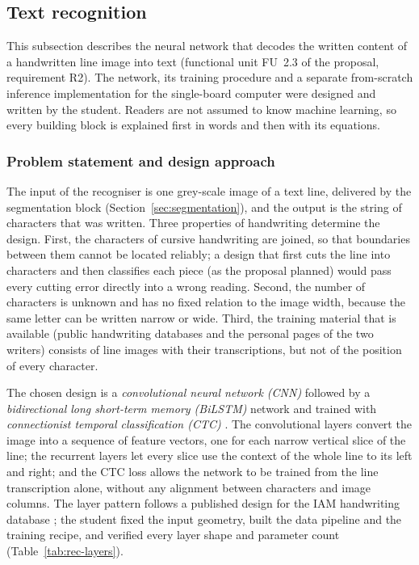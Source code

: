 \subsection{Text recognition}
\label{sec:textrec}

This subsection describes the neural network that decodes the written content of a handwritten line image into text (functional unit FU~2.3 of the proposal, requirement R2).
The network, its training procedure and a separate from-scratch inference implementation for the single-board computer were designed and written by the student.
Readers are not assumed to know machine learning, so every building block is explained first in words and then with its equations.

\subsubsection{Problem statement and design approach}

The input of the recogniser is one grey-scale image of a text line, delivered by the segmentation block (Section~\ref{sec:segmentation}), and the output is the string of characters that was written.
Three properties of handwriting determine the design.
First, the characters of cursive handwriting are joined, so that boundaries between them cannot be located reliably; a design that first cuts the line into characters and then classifies each piece (as the proposal planned) would pass every cutting error directly into a wrong reading.
Second, the number of characters is unknown and has no fixed relation to the image width, because the same letter can be written narrow or wide.
Third, the training material that is available (public handwriting databases and the personal pages of the two writers) consists of line images with their transcriptions, but not of the position of every character.

The chosen design is a \emph{convolutional neural network (CNN)} followed by a \emph{bidirectional long short-term memory (BiLSTM)} network and trained with \emph{connectionist temporal classification (CTC)} \cite{graves2006,shi2017}.
The convolutional layers convert the image into a sequence of feature vectors, one for each narrow vertical slice of the line; the recurrent layers let every slice use the context of the whole line to its left and right; and the CTC loss allows the network to be trained from the line transcription alone, without any alignment between characters and image columns.
The layer pattern follows a published design for the IAM handwriting database \cite{kizilirmak2023}; the student fixed the input geometry, built the data pipeline and the training recipe, and verified every layer shape and parameter count (Table~\ref{tab:rec-layers}).

